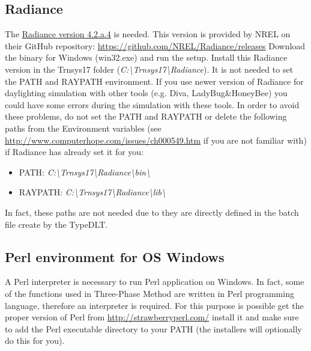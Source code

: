 \subsection{Radiance}
The \underline{Radiance version 4.2.a.4} is needed. This version is provided by NREL on their GitHub repository: \url{https://github.com/NREL/Radiance/releases} 
Download the binary for Windows (win32.exe) and run the setup. Install this Radiance version in the Trnsys17 folder (\textit{C:\textbackslash Trnsys17\textbackslash Radiance}). It is not needed to set the PATH and RAYPATH environment.
If you use newer version of Radiance for daylighting simulation with other tools (e.g. Diva, LadyBug\&HoneyBee) you could have some errors during the simulation with these tools. In order to avoid these problems, do not set the PATH and RAYPATH or delete the following paths from the Environment variables (see \url{http://www.computerhope.com/issues/ch000549.htm} if you are not familiar with) if Radiance has already set it for you:
\begin{itemize}
\renewcommand{\labelitemi}{\tiny$\blacksquare$}
\item PATH: \textit{ C:\textbackslash Trnsys17\textbackslash Radiance\textbackslash bin\textbackslash }
\item RAYPATH: \textit{ C:\textbackslash Trnsys17\textbackslash Radiance\textbackslash lib\textbackslash }
\end{itemize}
In fact, these paths are not needed due to they are directly defined in the batch file create by the TypeDLT.

\subsection{Perl environment for OS Windows}
A Perl interpreter is necessary to run Perl application on Windows. In fact, some of the functions used in Three-Phase Method are written in Perl programming language, therefore an interpreter is required. 
For this purpose is possible get the proper version of Perl from \url{http://strawberryperl.com/} install it and make sure to add the Perl executable directory to your PATH (the installers will optionally do this for you).

